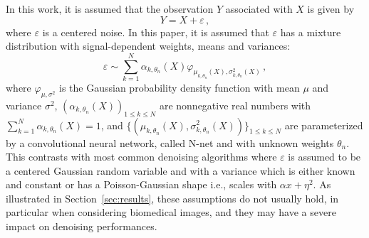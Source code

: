 \documentclass{article}
\begin{document}
In this work, it is assumed that the observation $Y$ associated with $X$  is given by
\begin{equation}
\label{eq:def:Y}
Y = X + \varepsilon\,,
\end{equation}
where $\varepsilon$ is a centered noise. In this paper, it is assumed that $\varepsilon$ has a mixture distribution with signal-dependent weights, means and variances:
$$
\varepsilon \sim \sum_{k=1}^N \alpha_{k,\theta_n}(X)\varphi_{\mu_{k,\theta_n}(X),\sigma_{k,\theta_n}^2(X)}\,,
$$
where $\varphi_{\mu,\sigma^2}$ is the Gaussian probability density function with mean $\mu$ and variance $\sigma^2$, $(\alpha_{k,\theta_n}(X))_{1\leqslant k\leqslant N}$ are nonnegative real numbers with $\sum_{k=1}^N\alpha_{k,\theta_n}(X) = 1$, and $\{(\mu_{k,\theta_n}(X),\sigma_{k,\theta_n}^2(X))\}_{1\leqslant k\leqslant N}$ are  parameterized by a convolutional neural network, called N-net and with unknown weights $\theta_n$.
This contrasts with most common denoising algorithms where $\varepsilon$ is assumed to be a centered Gaussian random variable and with a variance which is either known and constant or has a Poisson-Gaussian shape i.e., scales with $\alpha x + \eta^2$.
As illustrated in Section~\ref{sec:results}, these assumptions do not usually hold, in particular when considering biomedical images, and they may have a severe impact on denoising performances.
\end{document}
